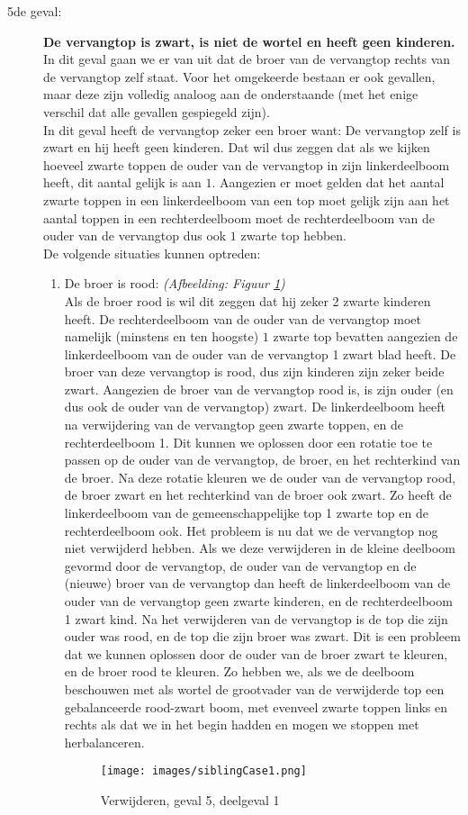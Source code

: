 \documentclass[11pt,a4paper]{report}
\begin{document}
\begin{description}
\item[5de geval:]
\textbf{De vervangtop is zwart, is niet de wortel en heeft geen kinderen.}\\
In dit geval gaan we er van uit dat de broer van de vervangtop rechts van de vervangtop zelf staat. Voor het omgekeerde bestaan er ook gevallen, maar deze zijn volledig analoog aan de onderstaande (met het enige verschil dat alle gevallen gespiegeld zijn).\\
In dit geval heeft de vervangtop zeker een broer want: De vervangtop zelf is zwart en hij heeft geen kinderen. Dat wil dus zeggen dat als we kijken hoeveel zwarte toppen de ouder van de vervangtop in zijn linkerdeelboom heeft, dit aantal gelijk is aan $1$. Aangezien er moet gelden dat het aantal zwarte toppen in een linkerdeelboom van een top moet gelijk zijn aan het aantal toppen in een rechterdeelboom moet de rechterdeelboom van de ouder van de vervangtop dus ook $1$ zwarte top hebben.\\
De volgende situaties kunnen optreden:
\begin{enumerate}
\item De broer is rood: \textsl{(Afbeelding: Figuur \ref{siblingCase1})}\\
Als de broer rood is wil dit zeggen dat hij zeker 2 zwarte kinderen heeft. De rechterdeelboom van de ouder van de vervangtop moet namelijk (minstens en ten hoogste) $1$ zwarte top bevatten aangezien de linkerdeelboom van de ouder van de vervangtop 1 zwart blad heeft. De broer van deze vervangtop is rood, dus zijn kinderen zijn zeker beide zwart. Aangezien de broer van de vervangtop rood is, is zijn ouder (en dus ook de ouder van de vervangtop) zwart. De linkerdeelboom heeft na verwijdering van de vervangtop geen zwarte toppen, en de rechterdeelboom 1. Dit kunnen we oplossen door een rotatie toe te passen op de ouder van de vervangtop, de broer, en het rechterkind van de broer. Na deze rotatie kleuren we de ouder van de vervangtop rood, de broer zwart en het rechterkind van de broer ook zwart. Zo heeft de linkerdeelboom van de gemeenschappelijke top 1 zwarte top en de rechterdeelboom ook. Het probleem is nu dat we de vervangtop nog niet verwijderd hebben. Als we deze verwijderen in de kleine deelboom gevormd door de vervangtop, de ouder van de vervangtop en de (nieuwe) broer van de vervangtop dan heeft de linkerdeelboom van de ouder van de vervangtop geen zwarte kinderen, en de rechterdeelboom 1 zwart kind. Na het verwijderen van de vervangtop is de top die zijn ouder was rood, en de top die zijn broer was zwart. Dit is een probleem dat we kunnen oplossen door de ouder van de broer zwart te kleuren, en de broer rood te kleuren. Zo hebben we, als we de deelboom beschouwen met als wortel de grootvader van de verwijderde top een gebalanceerde rood-zwart boom, met evenveel zwarte toppen links en rechts als dat we in het begin hadden en mogen we stoppen met herbalanceren.\\
\begin{figure}[h!]
	\centering
		\texttt{[image: images/siblingCase1.png]}
	\caption{Verwijderen, geval 5, deelgeval 1}
	\label{siblingCase1}
\end{figure}


\end{enumerate}
\end{description}
\end{document}
